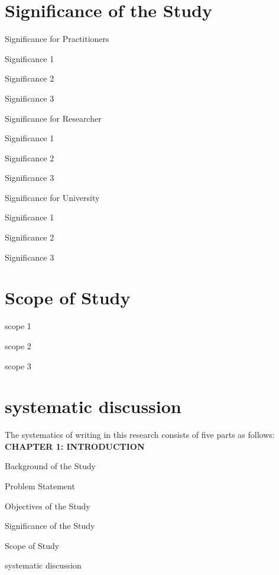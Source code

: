 	\section{Significance of the Study}
		\begin{secenumerate}
			\item Significance for Practitioners
				\begin{secenumerate}
					\item Significance 1
					\item Significance 2
					\item Significance 3
				\end{secenumerate}
			\item Significance for Researcher
				\begin{secenumerate}
					\item Significance 1
					\item Significance 2
					\item Significance 3
				\end{secenumerate}
			\item Significance for University
				\begin{secenumerate}
					\item Significance 1
					\item Significance 2
					\item Significance 3
				\end{secenumerate}
		\end{secenumerate}
		
	\section{Scope of Study}
		\begin{secenumerate}
			\item scope 1
			\item scope 2
			\item scope 3
		\end{secenumerate}
	
	\section{systematic discussion}
	The systematics of writing in this research consists of five parts as follows:\\
	
	\noindent 
	\textbf{CHAPTER 1: INTRODUCTION}
	\begin{sysenumerate}
		\setcounter{sysenumeratei}{1}
		\item[] 
		\begin{sysenumerate}
			\item Background of the Study      
			\item Problem Statement          
			\item Objectives of the Study
			\item Significance of the Study
			\item Scope of Study
			\item systematic discussion
		\end{sysenumerate}
	\end{sysenumerate}
	
